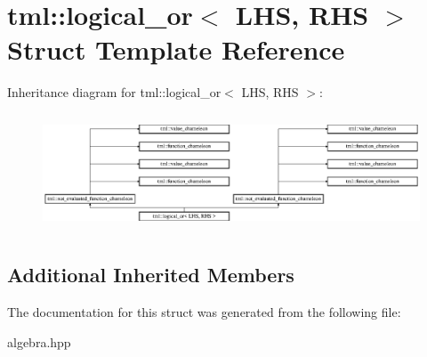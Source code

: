 \hypertarget{structtml_1_1logical__or}{\section{tml\+:\+:logical\+\_\+or$<$ L\+H\+S, R\+H\+S $>$ Struct Template Reference}
\label{structtml_1_1logical__or}
}
Inheritance diagram for tml\+:\+:logical\+\_\+or$<$ L\+H\+S, R\+H\+S $>$\+:\begin{figure}[H]
\begin{center}
\leavevmode
\includegraphics[height=3.500000cm]{structtml_1_1logical__or}
\end{center}
\end{figure}
\subsection*{Additional Inherited Members}


The documentation for this struct was generated from the following file\+:\begin{DoxyCompactItemize}
\item 
algebra.\+hpp\end{DoxyCompactItemize}
